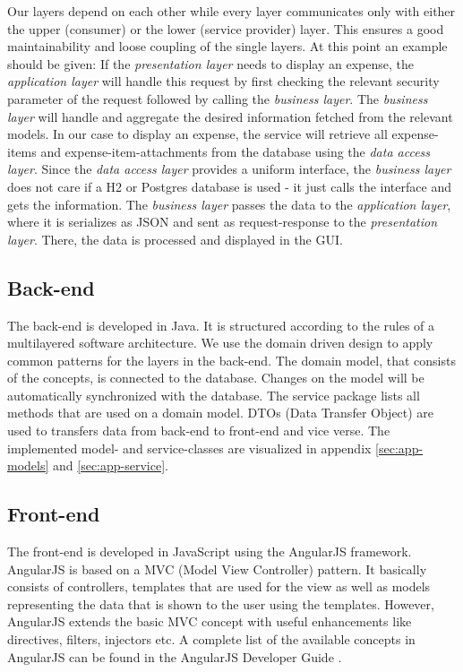 Our layers depend on each other while every layer communicates only with either the upper (consumer) or the lower (service provider) layer. This ensures a good maintainability and loose coupling of the single layers.\newline
At this point an example should be given: If the \textit{presentation layer} needs to display an expense, the \textit{application layer} will handle this request by first checking the relevant security parameter of the request followed by calling the \textit{business layer}. The \textit{business layer} will handle and aggregate the desired information fetched from the relevant models. In our case to display an expense, the service will retrieve all expense-items and expense-item-attachments from the database using the \textit{data access layer}. Since the \textit{data access layer} provides a uniform interface, the \textit{business layer} does not care if a H2 or Postgres database is used - it just calls the interface and gets the information. The \textit{business layer} passes the data to the \textit{application layer}, where it is serializes as JSON and sent as request-response to the \textit{presentation layer}. There, the data is processed and displayed in the GUI.

\subsection{Back-end}
The back-end is developed in Java. It is structured according to the rules of a multilayered software architecture. We use the domain driven design \cite{ddd} to apply common patterns for the layers in the back-end. The domain model, that consists of the concepts, is connected to the database. Changes on the model will be automatically synchronized with the database. The service package lists all methods that are used on a domain model.\newline
DTOs (Data Transfer Object) are used to transfers data from back-end to front-end and vice verse. \newline The implemented model- and service-classes are visualized in appendix \ref{sec:app-models} and \ref{sec:app-service}. \par



\subsection{Front-end}
The front-end is developed in JavaScript using the AngularJS framework\cite{angular}. AngularJS is based on a MVC (Model View Controller) pattern. It basically consists of controllers, templates that are used for the view  as well as models representing the data that is shown to the user using the templates. However, AngularJS  extends the basic MVC concept with useful enhancements like directives, filters, injectors etc. A complete list of the available concepts in AngularJS can be found in the AngularJS Developer Guide \cite{angular-devguide}.

